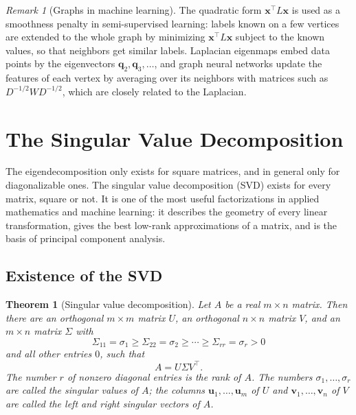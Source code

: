 \documentclass[11pt]{article}
\theoremstyle{definition}
\theoremstyle{plain}
\newtheorem{theorem}[definition]{Theorem}
\theoremstyle{remark}
\newtheorem{remark}[definition]{Remark}
\begin{document}
\begin{remark}[Graphs in machine learning]
    The quadratic form $\mathbf{x}^\top L\mathbf{x}$ is used as a smoothness penalty in semi-supervised learning: labels known on a few vertices are extended to the whole graph by minimizing $\mathbf{x}^\top L\mathbf{x}$ subject to the known values, so that neighbors get similar labels. Laplacian eigenmaps embed data points by the eigenvectors $\mathbf{q}_2, \mathbf{q}_3, \ldots$, and graph neural networks update the features of each vertex by averaging over its neighbors with matrices such as $D^{-1/2}WD^{-1/2}$, which are closely related to the Laplacian.
\end{remark}

\section{The Singular Value Decomposition}\label{sec:svd}

The eigendecomposition only exists for square matrices, and in general only for diagonalizable ones. The singular value decomposition (SVD) exists for every matrix, square or not. It is one of the most useful factorizations in applied mathematics and machine learning: it describes the geometry of every linear transformation, gives the best low-rank approximations of a matrix, and is the basis of principal component analysis.

\subsection{Existence of the SVD}

\begin{theorem}[Singular value decomposition]\label{thm:svd}
    Let $A$ be a real $m \times n$ matrix. Then there are an orthogonal $m \times m$ matrix $U$, an orthogonal $n \times n$ matrix $V$, and an $m \times n$ matrix $\Sigma$ with
    \[\Sigma_{11} = \sigma_1 \geq \Sigma_{22} = \sigma_2 \geq \cdots \geq \Sigma_{rr} = \sigma_r > 0\]
    and all other entries $0$, such that
    \[A = U \Sigma V^\top.\]
    The number $r$ of nonzero diagonal entries is the rank of $A$. The numbers $\sigma_1, \ldots, \sigma_r$ are called the singular values of $A$; the columns $\mathbf{u}_1, \ldots, \mathbf{u}_m$ of $U$ and $\mathbf{v}_1, \ldots, \mathbf{v}_n$ of $V$ are called the left and right singular vectors of $A$.
\end{theorem}
\end{document}
